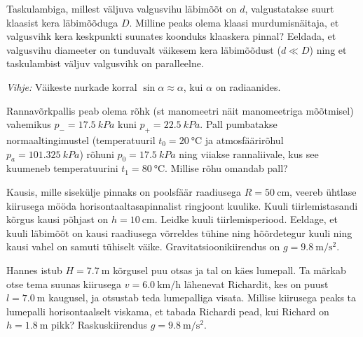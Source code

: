 \documentclass[10pt]{article}
\begin{document}
\setAuthor{}

Taskulambiga, millest väljuva valgusvihu läbimõõt on $d$, valgustatakse suurt
klaasist kera läbimõõduga $D$. Milline peaks olema klaasi murdumisnäitaja, et
valgusvihk kera keskpunkti suunates koonduks klaaskera pinnal? Eeldada, et
valgusvihu diameeter on tunduvalt väikesem kera läbimõõdust ($d\ll D$) ning et
taskulambist väljuv valgusvihk on paralleelne.

\emph{Vihje:} Väikeste nurkade korral $\sin \alpha \approx \alpha$, kui $\alpha$
on radiaanides.
\probend
\bigskip


Rannavõrkpallis peab olema rõhk (st manomeetri näit manomeetriga mõõtmisel) vahemikus $p_-=\SI{17.5}{kPa}$ kuni $p_+=\SI{22.5}{kPa}$. Pall pumbatakse normaaltingimustel (temperatuuril $t_0=\SI{20}{\celsius}$ ja atmosfäärirõhul $p_a=\SI{101.325}{kPa}$) rõhuni $p_0=\SI{17.5}{kPa}$ ning viiakse rannaliivale, kus see kuumeneb temperatuurini $t_1=\SI{80}{\celsius}$. Millise rõhu omandab pall?
\probend
\bigskip


Kausis, mille sisekülje pinnaks on poolsfäär raadiusega $R=\SI{50}{\centi\meter}$, veereb ühtlase kiirusega mööda horisontaaltasapinnalist ringjoont kuulike. Kuuli tiirlemistasandi kõrgus kausi põhjast on $h=\SI{10}{\centi\meter}$. Leidke kuuli tiirlemisperiood. Eeldage, et kuuli läbimõõt on kausi raadiusega võrreldes tühine ning hõõrdetegur kuuli ning kausi vahel on samuti tühiselt väike. Gravitatsioonikiirendus on $g=\SI{9.8}{\meter\per\second\squared}$.
\probend
\bigskip


Hannes istub $H=\SI{7.7}{\m}$ kõrgusel puu otsas ja tal on käes lumepall. Ta märkab otse tema suunas kiirusega $v=\SI{6.0}{\km\per\hour}$ lähenevat Richardit, kes on puust $l=\SI{7.0}{\m}$ kaugusel, ja otsustab teda lumepalliga visata. Millise kiirusega peaks ta lumepalli horisontaalselt viskama, et tabada Richardi pead, kui Richard on $h=\SI{1.8}{\m}$ pikk? Raskuskiirendus $g=\SI{9.8}{\m\per\s\squared}$.
\probend
\bigskip
\end{document}
